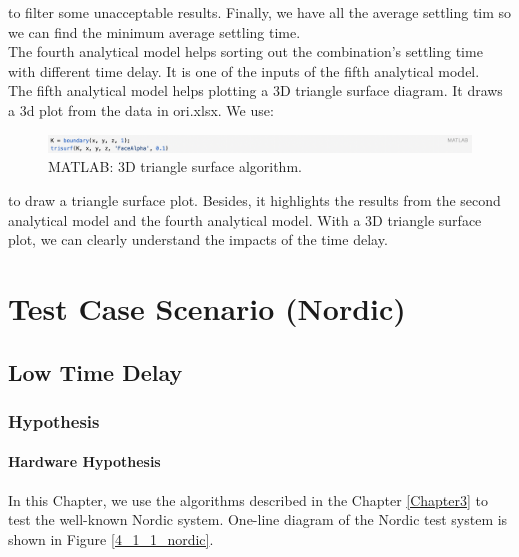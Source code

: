 \documentclass{report}
\begin{document}
to filter some unacceptable results. Finally, we have all the average settling tim so we can find the minimum average settling time.\\

The fourth analytical model helps sorting out the combination’s settling time with different time delay. It is one of the inputs of the fifth analytical model.\\

The fifth analytical model helps plotting a 3D triangle surface diagram. It draws a 3d plot from the data in ori.xlsx. We use:\\

\begin{figure}[htbp]
\centering
\includegraphics[width = .999\textwidth]{figure/3_4_2_code7.png}
\caption{MATLAB: 3D triangle surface algorithm.}
\label{3_4_2_code7}
\end{figure}

to draw a triangle surface plot. Besides, it highlights the results from the second analytical model and the fourth analytical model. With a 3D triangle surface plot, we can clearly understand the impacts of the time delay.\\


\part{Test Case Scenario (Nordic) }
\chapter{Low Time Delay}
\label{Chapter4} %
\section{Hypothesis} %
\label{section4.1}
\subsection{Hardware Hypothesis} %
\label{subsection4.1.1}

In this Chapter, we use the algorithms described in the Chapter \textcolor{red}{\ref{Chapter3}} to test the well-known Nordic system. One-line diagram of the Nordic test system is  shown in Figure \textcolor{red}{\ref{4_1_1_nordic}}.\\
\end{document}
